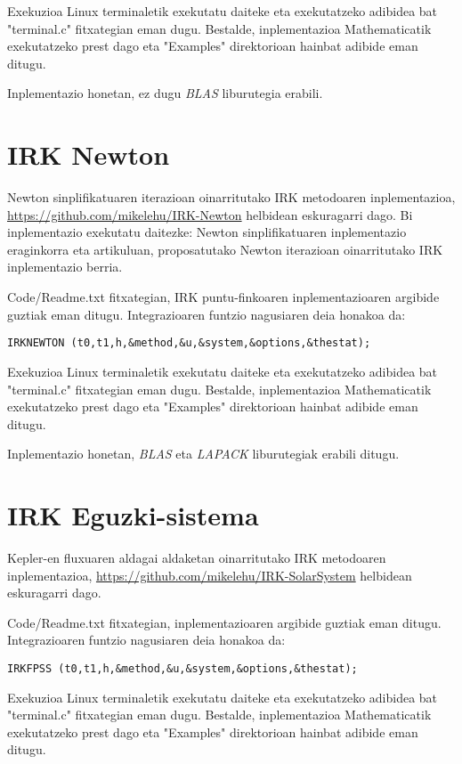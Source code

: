 Exekuzioa Linux terminaletik exekutatu daiteke eta exekutatzeko adibidea bat  "terminal.c" fitxategian eman dugu. 
Bestalde, inplementazioa Mathematicatik exekutatzeko prest dago eta "Examples" direktorioan hainbat adibide eman ditugu.    

Inplementazio honetan, ez dugu \emph{BLAS} liburutegia erabili. 

\section{IRK Newton}

Newton sinplifikatuaren iterazioan oinarritutako IRK metodoaren inplementazioa, \url{https://github.com/mikelehu/IRK-Newton} helbidean eskuragarri dago. Bi inplementazio exekutatu daitezke: Newton sinplifikatuaren inplementazio eraginkorra eta artikuluan, proposatutako Newton iterazioan oinarritutako IRK inplementazio berria.

Code/Readme.txt fitxategian, IRK puntu-finkoaren inplementazioaren argibide guztiak eman ditugu. Integrazioaren funtzio nagusiaren deia honakoa da:   
\begin{lstlisting}
IRKNEWTON (t0,t1,h,&method,&u,&system,&options,&thestat);
\end{lstlisting}

Exekuzioa Linux terminaletik exekutatu daiteke eta exekutatzeko adibidea bat  "terminal.c" fitxategian eman dugu. 
Bestalde, inplementazioa Mathematicatik exekutatzeko prest dago eta "Examples" direktorioan hainbat adibide eman ditugu. 

Inplementazio honetan, \emph{BLAS} eta \emph{LAPACK} liburutegiak erabili ditugu.

\section{IRK Eguzki-sistema}

Kepler-en fluxuaren aldagai aldaketan oinarritutako IRK metodoaren inplementazioa, \url{https://github.com/mikelehu/IRK-SolarSystem} helbidean eskuragarri dago.  

Code/Readme.txt fitxategian, inplementazioaren argibide guztiak eman ditugu. Integrazioaren funtzio nagusiaren deia honakoa da:   
\begin{lstlisting}
IRKFPSS (t0,t1,h,&method,&u,&system,&options,&thestat);
\end{lstlisting}

Exekuzioa Linux terminaletik exekutatu daiteke eta exekutatzeko adibidea bat  "terminal.c" fitxategian eman dugu. 
Bestalde, inplementazioa Mathematicatik exekutatzeko prest dago eta "Examples" direktorioan hainbat adibide eman ditugu.  

